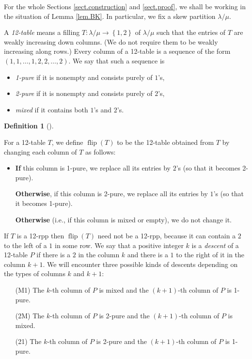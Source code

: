 \documentclass[numbers=enddot,12pt,final,onecolumn,notitlepage]{scrartcl}%
\theoremstyle{definition}
\newtheorem{defi}[theo]{Definition}
\newenvironment{definition}[1][]
{\begin{defi}[#1]\begin{leftbar}}
{\end{leftbar}\end{defi}}
\def\lm{{\lambda/\mu}}
\def\flip{{\operatorname{flip}}}
\begin{document}
For the whole Sections \ref{sect.construction} and \ref{sect.proof},
we shall be working in the situation of Lemma \ref{lem.BK}. In
particular, we fix a skew partition $\lm$.

A \textit{12-table} means a filling $T:\lm\rightarrow\left\{  1,2\right\}  $
of $\lm$
such that the entries of $T$ are weakly increasing down columns. (We do not
require them to be weakly increasing along rows.) Every column of a 12-table
is a sequence of the form $(1,1,\ldots,1,2,2,\ldots,2)$. We say that such a sequence is

\begin{itemize}
\item \textit{1-pure} if it is nonempty and consists purely of $1$'s,

\item \textit{2-pure} if it is nonempty and consists purely of $2$'s,

\item \textit{mixed} if it contains both $1$'s and $2$'s.
\end{itemize}

\def\flip{{\operatorname*{flip}}}

\begin{definition}
 \label{defi.flip}
For a 12-table $T$, we define $\flip(T)$ to be the 12-table obtained from $T$ by changing each column of $T$ as follows:

\begin{itemize}
\item \textbf{If} this column is 1-pure, we replace all its entries by $2$'s
(so that it becomes 2-pure).

\textbf{Otherwise}, if this column is 2-pure, we replace all its entries by
$1$'s (so that it becomes 1-pure).

\textbf{Otherwise} (i.e., if this column is mixed or empty), we do not change it.
\end{itemize}

\end{definition}


If $T$ is a 12-rpp then $\flip(T)$ need not be a 12-rpp, because it can contain a $2$ to the left of a $1$ in some row. We say that a positive integer $k$ is a \textit{descent} of a 12-table $P$ if there is a $2$ in the column $k$ and there is a $1$ to the right of it in the column $k+1$. We will encounter three possible kinds of descents depending on the types of columns $k$ and $k+1$:

\begin{itemize}
\item[(M1)] The $k$-th column of $P$ is mixed and the $\left(  k+1\right)  $-th column of $P$ is 1-pure.

\item[(2M)] The $k$-th column of $P$ is 2-pure and the $\left(  k+1\right)  $-th column of $P$ is mixed.

\item[(21)] The $k$-th column of $P$ is 2-pure and the $\left(  k+1\right)  $-th column of $P$ is 1-pure.
\end{itemize}
\end{document}
